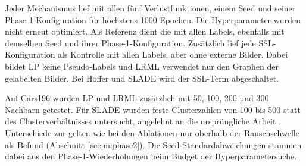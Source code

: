 Jeder Mechanismus lief mit allen fünf Verlustfunktionen, einem Seed und seiner Phase-1-Konfiguration für höchstens \num{1000} Epochen. Die Hyperparameter wurden nicht erneut optimiert. Als Referenz dient die \UEBL mit allen Labels, ebenfalls mit demselben Seed und ihrer Phase-1-Konfiguration. Zusätzlich lief jede \ac{SSL}-Konfiguration als Kontrolle mit allen Labels, aber ohne externe Bilder. Dabei bildet \ac{LP} keine Pseudo-Labels und \ac{LRML} verwendet nur den Graphen der gelabelten Bilder. Bei Hoffer und \ac{SLADE} wird der \ac{SSL}-Term abgeschaltet.

Auf Cars196 wurden \ac{LP} und \ac{LRML} zusätzlich mit 50, 100, 200 und 300 Nachbarn getestet. Für \ac{SLADE} wurden feste Clusterzahlen von 100 bis 500 statt des Clusterverhältnisses untersucht, angelehnt an die ursprüngliche Arbeit \cite{duan_slade_2021}. Unterschiede zur \UEBL gelten wie bei den Ablationen nur oberhalb der Rauschschwelle als Befund (Abschnitt \ref{sec:m:phase2}). Die Seed-Standardabweichungen stammen dabei aus den Phase-1-Wiederholungen beim Budget der Hyperparametersuche.

